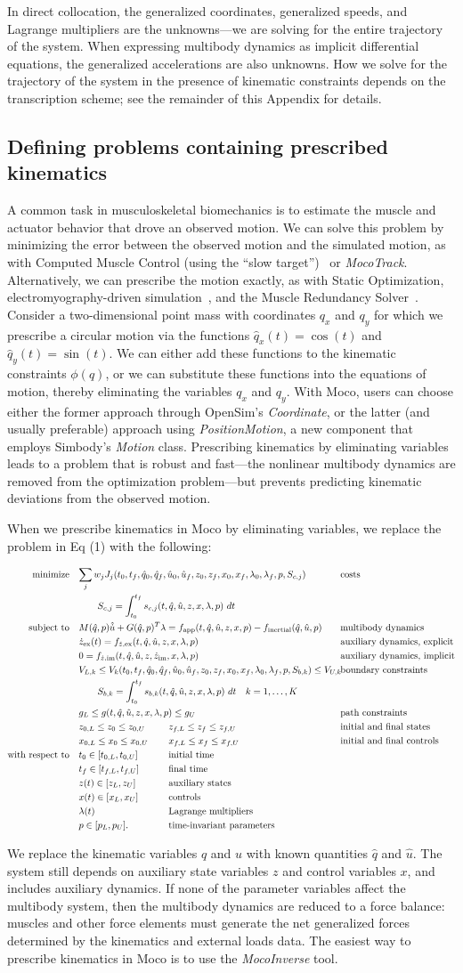 \documentclass[10pt,letterpaper]{article}
\newcommand{\prescribed}{
\begin{adjustwidth}{-1.125in}{-1.125in} %
\begin{align}
    \begin{aligned}
        \mbox{minimize} \quad & \mathrlap{\sum_j w_j J_{j}(t_0, t_f, \hat{q}_0, \hat{q}_f, \hat{u}_0, \hat{u}_f, z_0, z_f, x_{0}, x_{f}, \lambda_0, \lambda_f, p, S_{c,j})} &&&\hspace{6em}& \textrm{costs} \\
        & \quad\quad \mathrlap{S_{c,j} = \int_{t_0}^{t_f} s_{c,j}(t, \hat{q}, \hat{u}, z, x, \lambda, p)~dt} \\
        \mbox{subject to} \quad &
         M(\hat{q}, p)\hat{\dot{u}} + \mathrlap{G(\hat{q}, p)^T \lambda = f_{\textrm{app}}(t, \hat{q}, \hat{u}, z, x, p) - f_{\textrm{inertial}}(\hat{q}, \hat{u}, p)} &&&& \textrm{multibody dynamics} \\
        & \mathrlap{\dot{z}_{\textrm{ex}}(t) = f_{\dot{z},\textrm{ex}}(t, \hat{q}, \hat{u}, z, x, \lambda, p)} &&&& \textrm{auxiliary dynamics, explicit} \\
        & \mathrlap{0 = f_{\dot{z},\textrm{im}}(t, \hat{q}, \hat{u}, z, \dot{z}_\textrm{im}, x, \lambda, p)} &&&& \textrm{auxiliary dynamics, implicit}\\
        & V_{L,k} \leq V_k(t_0, t_f, \hat{q}_0, \mathrlap{\hat{q}_f, \hat{u}_0, \hat{u}_f, z_0, z_f, x_{0}, x_{f}, \lambda_0, \lambda_f, p, S_{b,k}) \leq V_{U,k}}  &&&& \textrm{boundary constraints} \\
        & \quad\quad \mathrlap{S_{b,k} = \int_{t_0}^{t_f} s_{b,k}(t, \hat{q}, \hat{u}, z, x, \lambda, p)~dt \quad k = 1, \ldots, K} \\
        & \mathrlap{g_{L} \leq g(t, \hat{q}, \hat{u}, z, x, \lambda, p) \leq g_{U}} &&&& \textrm{path constraints} \\
        & z_{0,L} \leq z_0 \leq z_{0,U} && z_{f,L} \leq z_f \leq z_{f,U} && \textrm{initial and final states} \\
        & x_{0,L} \leq x_0 \leq x_{0,U} && x_{f,L} \leq x_f \leq x_{f,U} && \textrm{initial and final controls} \\
        \mbox{with respect to} \quad
        & t_0 \in [t_{0,L}, t_{0,U}] && \textrm{initial time} \\
        & t_f \in [t_{f,L}, t_{f,U}] && \textrm{final time} \\
        & z(t) \in [z_{L}, z_{U}] && \textrm{auxiliary states} \\
        & x(t) \in [x_{L}, x_{U}] && \textrm{controls} \\
        & \lambda(t) && \textrm{Lagrange multipliers} \\
        & p \in [p_{L}, p_{U}]. && \textrm{time-invariant parameters}
    \end{aligned}
\end{align}
\end{adjustwidth}
}
\begin{document}
In direct collocation, the generalized coordinates, generalized speeds, and Lagrange multipliers are the unknowns—we are solving for the entire trajectory of the system. When expressing multibody dynamics as implicit differential equations, the generalized accelerations are also unknowns. How we solve for the trajectory of the system in the presence of kinematic constraints depends on the transcription scheme; see the remainder of this Appendix for details.

\subsection*{Defining problems containing prescribed kinematics}

A common task in musculoskeletal biomechanics is to estimate the muscle and actuator behavior that drove an observed motion. We can solve this problem by minimizing the error between the observed motion and the simulated motion, as with Computed Muscle Control (using the ``slow target'')~\cite{Thelen:2003bba} or \textit{MocoTrack}. Alternatively, we can prescribe the motion exactly, as with Static Optimization, electromyography-driven simulation~\cite{Lloyd:2003}, and the Muscle Redundancy Solver~\cite{Groote:2016dq}. Consider a two-dimensional point mass with coordinates $q_x$ and $q_y$ for which we prescribe a circular motion via the functions $\hat{q}_x(t) = \cos(t)$ and $\hat{q}_y(t) = \sin(t)$. We can either add these functions to the kinematic constraints $\phi(q)$, or we can substitute these functions into the equations of motion, thereby eliminating the variables $q_x$ and $q_y$. With Moco, users can choose either the former approach through OpenSim's \textit{Coordinate}, or the latter (and usually preferable) approach using \textit{PositionMotion}, a new component that employs Simbody's \textit{Motion} class. Prescribing kinematics by eliminating variables leads to a problem that is robust and fast---the nonlinear multibody dynamics are removed from the optimization problem---but prevents predicting kinematic deviations from the observed motion.

When we prescribe kinematics in Moco by eliminating variables, we replace the problem in Eq (1) with the following:

\prescribed

We replace the kinematic variables $q$ and $u$ with known quantities $\hat{q}$ and $\hat{u}$. The system still depends on auxiliary state variables $z$ and control variables $x$, and includes auxiliary dynamics. If none of the parameter variables affect the multibody system, then the multibody dynamics are reduced to a force balance: muscles and other force elements must generate the net generalized forces determined by the kinematics and external loads data. The easiest way to prescribe kinematics in Moco is to use the \textit{MocoInverse} tool.
\end{document}
